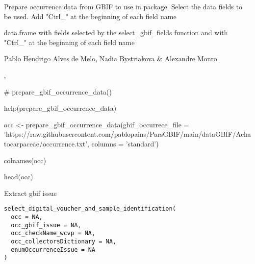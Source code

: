 \documentclass[a4paper]{book}
\begin{document}
%
\begin{Details}
Prepare occurrence data from GBIF to use in package.
Select the data fields to be used.
Add "Ctrl\_" at the beginning of each field name
\end{Details}
%
\begin{Value}
data.frame with fields selected by the select\_gbif\_fields function and with "Ctrl\_" at the beginning of each field name
\end{Value}
%
\begin{Author}
Pablo Hendrigo Alves de Melo,
Nadia Bystriakova \&
Alexandre Monro
\end{Author}
%
\begin{SeeAlso}
, 
\end{SeeAlso}
%
\begin{Examples}
\begin{ExampleCode}

# prepare_gbif_occurrence_data()

help(prepare_gbif_occurrence_data)

occ <- prepare_gbif_occurrence_data(gbif_occurrece_file = 'https://raw.githubusercontent.com/pablopains/ParsGBIF/main/dataGBIF/Achatocarpaceae/occurrence.txt',
                                    columns = 'standard')

colnames(occ)

head(occ)

\end{ExampleCode}
\end{Examples}
%
\begin{Description}
Extract gbif issue
\end{Description}
%
\begin{Usage}
\begin{verbatim}
select_digital_voucher_and_sample_identification(
  occ = NA,
  occ_gbif_issue = NA,
  occ_checkName_wcvp = NA,
  occ_collectorsDictionary = NA,
  enumOccurrenceIssue = NA
)
\end{verbatim}
\end{Usage}
%
\end{document}
